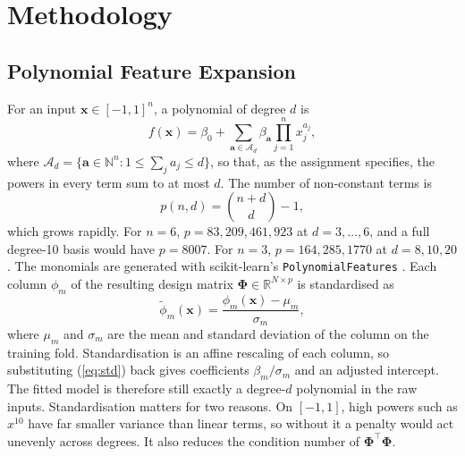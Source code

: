 \documentclass[conference]{IEEEtran}
\begin{document}
\section{Methodology}\label{sec:method}
\subsection{Polynomial Feature Expansion}
For an input $\mathbf{x}\in[-1,1]^n$, a polynomial of degree $d$ is
\begin{equation}
f(\mathbf{x}) = \beta_0 + \sum_{\mathbf{a}\in\mathcal{A}_d} \beta_{\mathbf{a}} \prod_{j=1}^{n} x_j^{a_j},
\label{eq:poly}
\end{equation}
where $\mathcal{A}_d=\{\mathbf{a}\in\mathbb{N}^n : 1\le \sum_j a_j\le d\}$, so that, as the assignment specifies, the powers in every term sum to at most $d$. The number of non-constant terms is
\begin{equation}
p(n,d)=\binom{n+d}{d}-1 ,
\label{eq:count}
\end{equation}
which grows rapidly. For $n=6$, $p=83, 209, 461, 923$ at $d=3,\dots,6$, and a full degree-10 basis would have $p=8007$. For $n=3$, $p=164, 285, 1770$ at $d=8, 10, 20$. The monomials are generated with scikit-learn's \texttt{PolynomialFeatures} \cite{pedregosa2011}. Each column $\phi_m$ of the resulting design matrix $\boldsymbol{\Phi}\in\mathbb{R}^{N\times p}$ is standardised as
\begin{equation}
\tilde\phi_m(\mathbf{x}) = \frac{\phi_m(\mathbf{x})-\mu_m}{\sigma_m},
\label{eq:std}
\end{equation}
where $\mu_m$ and $\sigma_m$ are the mean and standard deviation of the column on the training fold. Standardisation is an affine rescaling of each column, so substituting (\ref{eq:std}) back gives coefficients $\beta_m/\sigma_m$ and an adjusted intercept. The fitted model is therefore still exactly a degree-$d$ polynomial in the raw inputs. Standardisation matters for two reasons. On $[-1,1]$, high powers such as $x^{10}$ have far smaller variance than linear terms, so without it a penalty would act unevenly across degrees. It also reduces the condition number of $\boldsymbol{\Phi}^\top\boldsymbol{\Phi}$.
\end{document}
